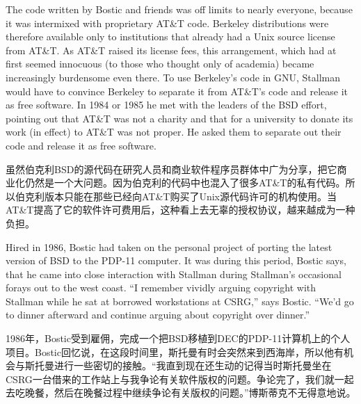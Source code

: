\ifdefined\eng
The code written by Bostic and friends was off limits to nearly everyone, because it was intermixed with proprietary AT\&T code. Berkeley distributions were therefore available only to institutions that already had a Unix source license from AT\&T. As AT\&T raised its license fees, this arrangement, which had at first seemed innocuous (to those who thought only of academia) became increasingly burdensome even there.  To use Berkeley's code in GNU, Stallman would have to convince Berkeley to separate it from AT\&T's code and release it as free software.  In 1984 or 1985 he met with the leaders of the BSD effort, pointing out that AT\&T was not a charity and that for a university to donate its work (in effect) to AT\&T was not proper.  He asked them to separate out their code and release it as free software.
\fi

\ifdefined\chs
虽然伯克利BSD的源代码在研究人员和商业软件程序员群体中广为分享，把它商业化仍然是一个大问题。因为伯克利的代码中也混入了很多AT\&T的私有代码。所以伯克利版本只能在那些已经向AT\&T购买了Unix源代码许可的机构使用。当AT\&T提高了它的软件许可费用后，这种看上去无辜的授权协议，越来越成为一种负担。
\fi

\ifdefined\eng
Hired in 1986, Bostic had taken on the personal project of porting the latest version of BSD to the PDP-11 computer. It was during this period, Bostic says, that he came into close interaction with Stallman during Stallman's occasional forays out to the west coast. ``I remember vividly arguing copyright with Stallman while he sat at borrowed workstations at CSRG,'' says Bostic. ``We'd go to dinner afterward and continue arguing about copyright over dinner.''
\fi

\ifdefined\chs
1986年，Bostic受到雇佣，完成一个把BSD移植到DEC的PDP-11计算机上的个人项目。Bostic回忆说，在这段时间里，斯托曼有时会突然来到西海岸，所以他有机会与斯托曼进行一些密切的接触。“我直到现在还生动的记得当时斯托曼坐在CSRG一台借来的工作站上与我争论有关软件版权的问题。争论完了，我们就一起去吃晚餐，然后在晚餐过程中继续争论有关版权的问题。”博斯蒂克不无得意地说。
\fi

